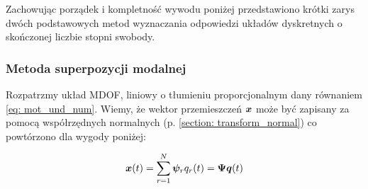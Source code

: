  Zachowując porządek i kompletność wywodu poniżej przedstawiono krótki zarys dwóch podstawowych metod wyznaczania odpowiedzi układów dyskretnych o skończonej liczbie stopni swobody.
 
 \subsubsection{Metoda superpozycji modalnej}
Rozpatrzmy układ MDOF, liniowy o tłumieniu proporcjonalnym dany równaniem \ref{eq: mot_und_num}. Wiemy, że wektor przemieszczeń $\bm{x}$ może być zapisany za pomocą współrzędnych normalnych (p. \ref{section: transform_normal}) co powtórzono dla wygody poniżej:

\begin{equation} \label{eq: superposition_modal_1_przytocz}
	\bm{x}(t) = \sum_{r=1}^{N} \bm{\psi}_r q_r(t)=\bm{\Psi q}(t)
\end{equation} 

